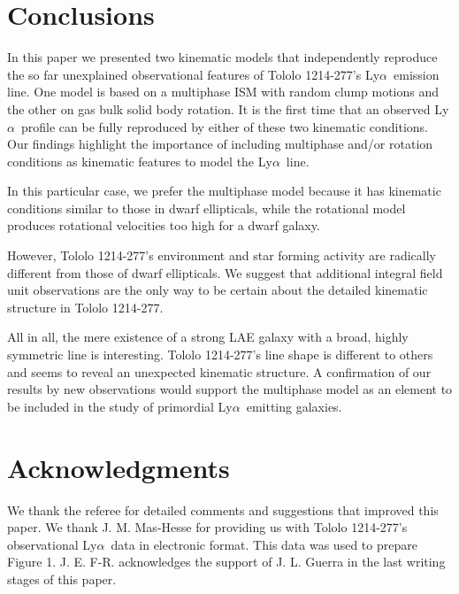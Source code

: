 \documentclass[a4,useAMS,usenatbib,usegraphicx]{mn2e}
\newcommand{\tol}{Tololo 1214-277}
\newcommand{\lya}{\ifmmode{{\rm Ly}\alpha}\else Ly$\alpha$\ \fi}
\begin{document}
\section{Conclusions}
\label{sec:conclusions}

In this paper we presented two kinematic models that independently
reproduce the so far unexplained observational features of \tol's
\lya emission line.
One model is based on a multiphase ISM with random clump motions and
the other on gas bulk solid body rotation. 
It is the first time that an observed \lya profile can be fully
reproduced by either of these two kinematic conditions.
Our findings highlight the importance of including multiphase and/or
rotation conditions as kinematic features to model the \lya line.

In this particular case, we prefer the multiphase model because it has kinematic
conditions similar to those in dwarf ellipticals, while the
rotational model produces rotational velocities too high for a dwarf
galaxy.  

However, \tol's environment and star forming activity are radically
different from those of dwarf ellipticals.
We suggest that additional integral field unit observations are the
only way to be certain about the detailed kinematic structure in \tol.

All in all, the mere existence of a strong LAE galaxy with a broad,
highly symmetric line is interesting. 
\tol's line shape is different to others and seems to reveal an
unexpected kinematic structure.
A confirmation of our results by new observations would support the multiphase model
as an element to be included in the study of primordial \lya emitting
galaxies.
 
\section*{Acknowledgments}
We thank the referee for detailed comments and suggestions that
improved this paper. 
We thank J. M. Mas-Hesse for providing us with \tol's observational
\lya data \citep{mashesse03} in electronic format. This data was
used to prepare Figure 1.
J. E. F-R. acknowledges the support of J. L. Guerra in the last
writing stages of this paper.
\end{document}
